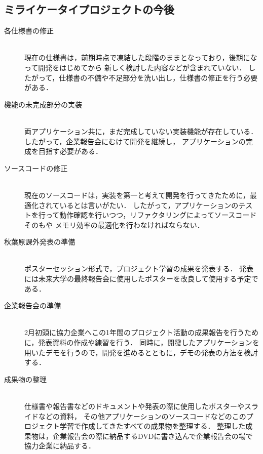 \subsection{ミライケータイプロジェクトの今後}

\begin{description}

\item[各仕様書の修正]\mbox{}\\ 
現在の仕様書は，前期時点で凍結した段階のままとなっており，後期になって開発をはじめてから
新しく検討した内容などが含まれていない．
したがって，仕様書の不備や不足部分を洗い出し，仕様書の修正を行う必要がある．

\item[機能の未完成部分の実装]\mbox{}\\ 
両アプリケーション共に，まだ完成していない実装機能が存在している．したがって，企業報告会にむけて開発を継続し，
アプリケーションの完成を目指す必要がある．

\item[ソースコードの修正]\mbox{}\\ 
現在のソースコードは，実装を第一と考えて開発を行ってきたために，最適化されているとは言いがたい．
したがって，アプリケーションのテストを行って動作確認を行いつつ，リファクタリングによってソースコードそのもや
メモリ効率の最適化を行わなければならない．

\item[秋葉原課外発表の準備]\mbox{}\\ 
ポスターセッション形式で，プロジェクト学習の成果を発表する．
発表には未来大学の最終報告会に使用したポスターを改良して使用する予定である．

\item[企業報告会の準備]\mbox{}\\ 
2月初頭に協力企業へこの1年間のプロジェクト活動の成果報告を行うために，発表資料の作成や練習を行う．
同時に，開發したアプリケーションを用いたデモを行うので，開発を進めるとともに，デモの発表の方法を検討する．

\item[成果物の整理]\mbox{}\\ 
仕様書や報告書などのドキュメントや発表の際に使用したポスターやスライドなどの資料，
その他アプリケーションのソースコードなどのこのプロジェクト学習で作成してきたすべての成果物を整理する．
整理した成果物は，企業報告会の際に納品するDVDに書き込んで企業報告会の場で協力企業に納品する．
\end{description}

